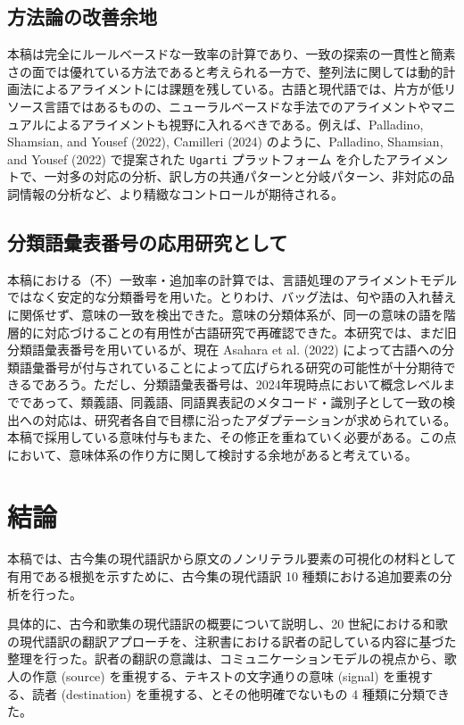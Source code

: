 \documentclass[
  letterpaper,
  DIV=11,
  numbers=noendperiod]{scrartcl}
\begin{document}
\subsection{方法論の改善余地}\label{ux65b9ux6cd5ux8ad6ux306eux6539ux5584ux4f59ux5730}

本稿は完全にルールベースドな一致率の計算であり、一致の探索の一貫性と簡素さの面では優れている方法であると考えられる一方で、整列法に関しては動的計画法によるアライメントには課題を残している。古語と現代語では、片方が低リソース言語ではあるものの、ニューラルベースドな手法でのアライメントやマニュアルによるアライメントも視野に入れるべきである。例えば、Palladino,
Shamsian, and Yousef (2022), Camilleri (2024) のように、Palladino,
Shamsian, and Yousef (2022) で提案された \texttt{Ugarti}
プラットフォーム
を介したアライメントで、一対多の対応の分析、訳し方の共通パターンと分岐パターン、非対応の品詞情報の分析など、より精緻なコントロールが期待される。

\subsection{分類語彙表番号の応用研究として}\label{ux5206ux985eux8a9eux5f59ux8868ux756aux53f7ux306eux5fdcux7528ux7814ux7a76ux3068ux3057ux3066}

本稿における（不）一致率・追加率の計算では、言語処理のアライメントモデルではなく安定的な分類番号を用いた。とりわけ、バッグ法は、句や語の入れ替えに関係せず、意味の一致を検出できた。意味の分類体系が、同一の意味の語を階層的に対応づけることの有用性が古語研究で再確認できた。本研究では、まだ旧分類語彙表番号を用いているが、現在
Asahara et al. (2022)
によって古語への分類語彙番号が付与されていることによって広げられる研究の可能性が十分期待できるであろう。ただし、分類語彙表番号は、2024年現時点において概念レベルまでであって、類義語、同義語、同語異表記のメタコード・識別子として一致の検出への対応は、研究者各自で目標に沿ったアダプテーションが求められている。本稿で採用している意味付与もまた、その修正を重ねていく必要がある。この点において、意味体系の作り方に関して検討する余地があると考えている。

\section{結論}\label{sec-conclusions}

本稿では、古今集の現代語訳から原文のノンリテラル要素の可視化の材料として有用である根拠を示すために、古今集の現代語訳
10 種類における追加要素の分析を行った。

具体的に、古今和歌集の現代語訳の概要について説明し、20
世紀における和歌の現代語訳の翻訳アプローチを、注釈書における訳者の記している内容に基づた整理を行った。訳者の翻訳の意識は、コミュニケーションモデルの視点から、歌人の作意
(source) を重視する、テキストの文字通りの意味 (signal) を重視する、読者
(destination) を重視する、とその他明確でないもの 4 種類に分類できた。
\end{document}
